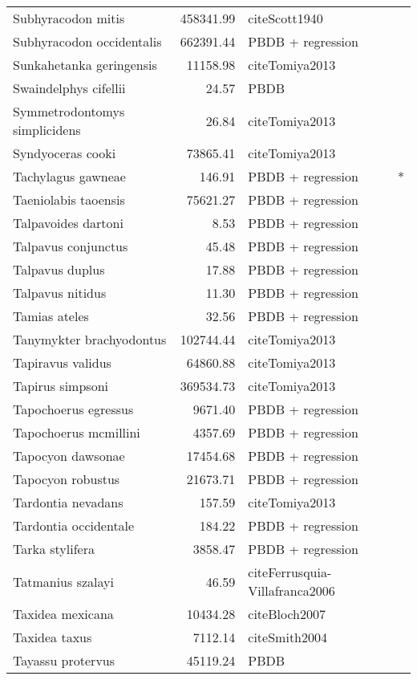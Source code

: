 \begin{table}[ht]
\begin{tabular}{lrll}
  Subhyracodon mitis & 458341.99 & cite{Scott1940} &  \\ 
  Subhyracodon occidentalis & 662391.44 & PBDB + regression &  \\ 
  Sunkahetanka geringensis & 11158.98 & cite{Tomiya2013} &  \\ 
  Swaindelphys cifellii & 24.57 & PBDB &  \\ 
  Symmetrodontomys simplicidens & 26.84 & cite{Tomiya2013} &  \\ 
  Syndyoceras cooki & 73865.41 & cite{Tomiya2013} &  \\ 
  Tachylagus gawneae & 146.91 & PBDB + regression & * \\ 
  Taeniolabis taoensis & 75621.27 & PBDB + regression &  \\ 
  Talpavoides dartoni & 8.53 & PBDB + regression &  \\ 
  Talpavus conjunctus & 45.48 & PBDB + regression &  \\ 
  Talpavus duplus & 17.88 & PBDB + regression &  \\ 
  Talpavus nitidus & 11.30 & PBDB + regression &  \\ 
  Tamias ateles & 32.56 & PBDB + regression &  \\ 
  Tanymykter brachyodontus & 102744.44 & cite{Tomiya2013} &  \\ 
  Tapiravus validus & 64860.88 & cite{Tomiya2013} &  \\ 
  Tapirus simpsoni & 369534.73 & cite{Tomiya2013} &  \\ 
  Tapochoerus egressus & 9671.40 & PBDB + regression &  \\ 
  Tapochoerus mcmillini & 4357.69 & PBDB + regression &  \\ 
  Tapocyon dawsonae & 17454.68 & PBDB + regression &  \\ 
  Tapocyon robustus & 21673.71 & PBDB + regression &  \\ 
  Tardontia nevadans & 157.59 & cite{Tomiya2013} &  \\ 
  Tardontia occidentale & 184.22 & PBDB + regression &  \\ 
  Tarka stylifera & 3858.47 & PBDB + regression &  \\ 
  Tatmanius szalayi & 46.59 & cite{Ferrusquia-Villafranca2006} &  \\ 
  Taxidea mexicana & 10434.28 & cite{Bloch2007} &  \\ 
  Taxidea taxus & 7112.14 & cite{Smith2004} &  \\ 
  Tayassu protervus & 45119.24 & PBDB &  \\ 

\end{tabular}
\end{table}
